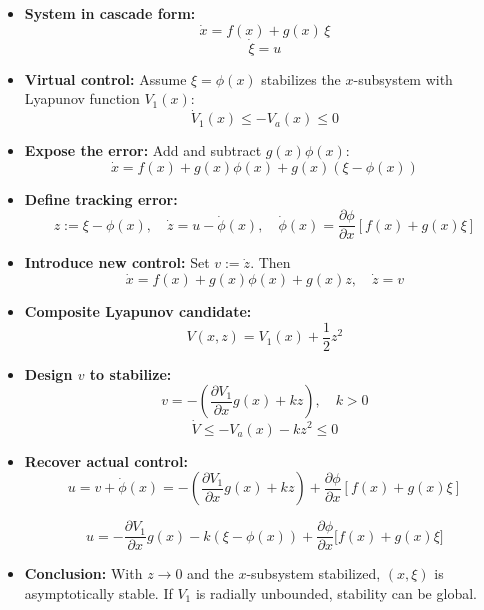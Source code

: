 \begin{itemize}
    \item \textbf{System in cascade form:}
    \[
        \dot{x} = f(x) + g(x)\, \xi  
    \]
    \[
        \dot{\xi} = u
    \]

    \item \textbf{Virtual control:} Assume $\xi = \phi(x)$ stabilizes the $x$-subsystem with Lyapunov function $V_1(x)$:
    \[
        \dot{V}_1(x) \le -V_a(x) \le 0
    \]

    \item \textbf{Expose the error:} Add and subtract $g(x)\phi(x)$:
    \[
        \dot{x} = f(x) + g(x)\phi(x) + g(x)(\xi - \phi(x))
    \]

    \item \textbf{Define tracking error:}
    \[
        z := \xi - \phi(x), \quad \dot{z} = u - \dot{\phi}(x), \quad 
        \dot{\phi}(x) = \frac{\partial \phi}{\partial x}[f(x) + g(x)\xi]
    \]

    \item \textbf{Introduce new control:} Set $v := \dot{z}$. Then
    \[
        \dot{x} = f(x) + g(x)\phi(x) + g(x) z, \quad \dot{z} = v
    \]

    \item \textbf{Composite Lyapunov candidate:}
    \[
        V(x,z) = V_1(x) + \frac{1}{2} z^2
    \]

    \item \textbf{Design $v$ to stabilize:}
    \[
        v = - \left( \frac{\partial V_1}{\partial x} g(x) + k z \right), \quad k>0
    \]
    \[
        \dot{V} \le - V_a(x) - k z^2 \le 0
    \]

    \item \textbf{Recover actual control:}
    \[
        u = v + \dot{\phi}(x)
          = - \left( \frac{\partial V_1}{\partial x} g(x) + k z \right) + \frac{\partial \phi}{\partial x}[f(x) + g(x)\xi]
    \]

    \[
    \boxed{
    u = - \frac{\partial V_1}{\partial x} g(x) - k (\xi - \phi(x)) + \frac{\partial \phi}{\partial x} \big[ f(x) + g(x) \xi \big]
    }
    \]
    

    \item \textbf{Conclusion:} With $z \to 0$ and the $x$-subsystem stabilized, $(x,\xi)$ is asymptotically stable. If $V_1$ is radially unbounded, stability can be global.
\end{itemize}






